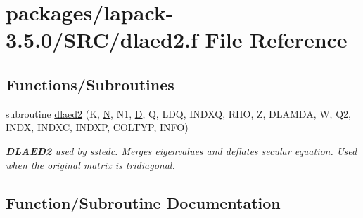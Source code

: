 \hypertarget{dlaed2_8f}{}\section{packages/lapack-\/3.5.0/\+S\+R\+C/dlaed2.f File Reference}
\label{dlaed2_8f}
\subsection*{Functions/\+Subroutines}
\begin{DoxyCompactItemize}
\item 
subroutine \hyperlink{dlaed2_8f_a391322d1faf47723521ae1d0a72f1559}{dlaed2} (K, \hyperlink{polmisc_8c_a0240ac851181b84ac374872dc5434ee4}{N}, N1, \hyperlink{odrpack_8h_a7dae6ea403d00f3687f24a874e67d139}{D}, Q, L\+D\+Q, I\+N\+D\+X\+Q, R\+H\+O, Z, D\+L\+A\+M\+D\+A, W, Q2, I\+N\+D\+X, I\+N\+D\+X\+C, I\+N\+D\+X\+P, C\+O\+L\+T\+Y\+P, I\+N\+F\+O)
\begin{DoxyCompactList}\small\item\em {\bfseries D\+L\+A\+E\+D2} used by sstedc. Merges eigenvalues and deflates secular equation. Used when the original matrix is tridiagonal. \end{DoxyCompactList}\end{DoxyCompactItemize}


\subsection{Function/\+Subroutine Documentation}
\hypertarget{dlaed2_8f_a391322d1faf47723521ae1d0a72f1559}{}
